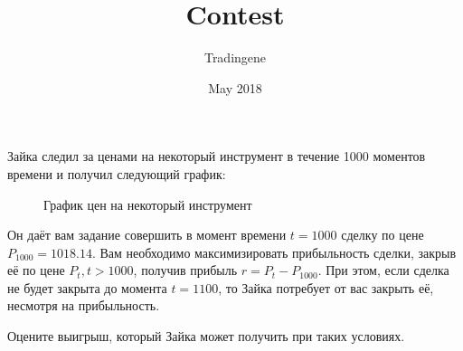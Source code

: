 \documentclass{article}
\title{Contest}
\author{Tradingene }
\date{May 2018}
\begin{document}
\maketitle

Зайка следил за ценами на некоторый инструмент в течение 1000 моментов времени и получил следующий график:

\begin{figure}[htbp]
\hspace*{0.2cm}                                                           
   

  \caption{График цен на некоторый инструмент}
  \label{fig:Prob1:MEA}
\end{figure}

Он даёт вам задание совершить в момент времени $t = 1000$ сделку по цене $P_{1000} = 1018.14$. Вам необходимо максимизировать прибыльность сделки, закрыв её по цене $P_t, t > 1000$, получив прибыль $r = P_t - P_{1000}$. При этом, если сделка не будет закрыта до момента $t = 1100$, то Зайка потребует от вас закрыть её, несмотря на прибыльность.

Оцените выигрыш, который Зайка может получить при таких условиях.
\end{document}
